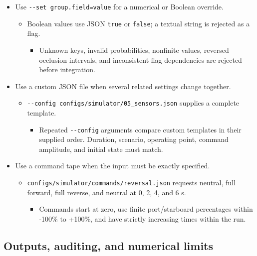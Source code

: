 \documentclass[10pt,letterpaper]{article}
\begin{document}
\begin{itemize}
\item
  Use \texttt{-\/-set\ group.field=value} for a numerical or Boolean override.

  \begin{itemize}
  \item
    Boolean values use JSON \texttt{true} or \texttt{false}; a textual string is rejected as a flag.

    \begin{itemize}
    \item
      Unknown keys, invalid probabilities, nonfinite values, reversed occlusion intervals, and inconsistent flag dependencies are rejected before integration.
    \end{itemize}
  \end{itemize}
\item
  Use a custom JSON file when several related settings change together.

  \begin{itemize}
  \item
    \texttt{-\/-config\ configs/simulator/05\_sensors.json} supplies a complete template.

    \begin{itemize}
    \item
      Repeated \texttt{-\/-config} arguments compare custom templates in their supplied order. Duration, scenario, operating point, command amplitude, and initial state must match.
    \end{itemize}
  \end{itemize}
\item
  Use a command tape when the input must be exactly specified.

  \begin{itemize}
  \item
    \texttt{configs/simulator/commands/reversal.json} requests neutral, full forward, full reverse, and neutral at 0, 2, 4, and 6 s.

    \begin{itemize}
    \item
      Commands start at zero, use finite port/starboard percentages within -100\% to +100\%, and have strictly increasing times within the run.
    \end{itemize}
  \end{itemize}
\end{itemize}

\subsection{Outputs, auditing, and numerical limits}
\end{document}
